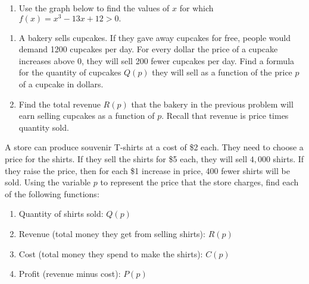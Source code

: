 \documentclass[10pt]{article}
\begin{document}
\newpage

\begin{enumerate}
\setcounter{enumi}{\theenumCount}

\item Use the graph below to find the values of $x$ for which $f(x) = x^{3} - 13 x + 12 > 0.$ 

\begin{flushright}
\end{flushright}

\setcounter{enumCount}{\theenumi}
\end{enumerate}


\begin{enumerate}
\setcounter{enumi}{\theenumCount}
\item A bakery sells cupcakes.  If they gave away cupcakes for free, people would demand 1200 cupcakes per day.  For every dollar the price of a cupcake increases above 0, they will sell 200 fewer cupcakes per day.  Find a formula for the quantity of cupcakes $Q(p)$ they will sell as a function of the price $p$ of a cupcake in dollars. \vfill

\item Find the total revenue $R(p)$ that the bakery in the previous problem will earn selling cupcakes as a function of $p$. Recall that revenue is price times quantity sold.  \vfill



\setcounter{enumCount}{\theenumi}
\end{enumerate}

\noindent
A store can produce souvenir T-shirts at a cost of \$2 each. They need to choose a price for the shirts. If they sell the shirts for \$5 each, they will sell $4,000$ shirts.  If they raise the price, then for each \$1 increase in price, 400 fewer shirts will be sold.  Using the variable $p$ to represent the price that the store charges, find each of the following functions:

\begin{enumerate}
\setcounter{enumi}{\theenumCount}
\item Quantity of shirts sold: $Q(p)$ 
\vfill

\item Revenue (total money they get from selling shirts): $R(p)$  \vfill

\item Cost (total money they spend to make the shirts): $C(p)$ \vfill

\item Profit (revenue minus cost): $P(p)$  \vfill


\setcounter{enumCount}{\theenumi}
\end{enumerate}
\end{document}
